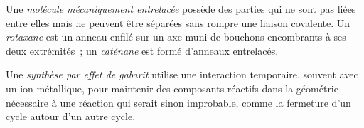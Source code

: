 \begin{definition}\label{def:b3:supramolecular:interlocked}
Une \emph{molécule mécaniquement entrelacée}
possède des parties qui ne sont pas liées entre elles mais ne peuvent être
séparées sans rompre une liaison covalente. Un \emph{rotaxane} est un anneau
enfilé sur un axe muni de bouchons encombrants à ses deux extrémités~; un
\emph{caténane} est formé d'anneaux entrelacés.
\end{definition}

\begin{definition}\label{def:b3:supramolecular:template}
Une \emph{synthèse par effet de gabarit} utilise une interaction
temporaire, souvent avec un ion métallique, pour maintenir des composants
réactifs dans la géométrie nécessaire à une réaction qui serait sinon
improbable, comme la fermeture d'un cycle autour d'un autre cycle.
\end{definition}

